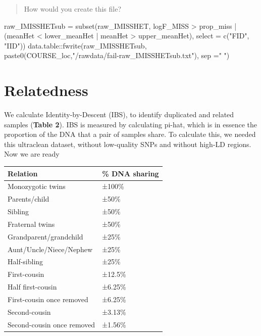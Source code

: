\documentclass[
]{book}
\newenvironment{Shaded}{\begin{snugshade}}{\end{snugshade}}
\newcommand{\AttributeTok}[1]{\textcolor[rgb]{0.77,0.63,0.00}{#1}}
\newcommand{\FunctionTok}[1]{\textcolor[rgb]{0.00,0.00,0.00}{#1}}
\newcommand{\NormalTok}[1]{#1}
\newcommand{\OtherTok}[1]{\textcolor[rgb]{0.56,0.35,0.01}{#1}}
\newcommand{\SpecialCharTok}[1]{\textcolor[rgb]{0.00,0.00,0.00}{#1}}
\newcommand{\StringTok}[1]{\textcolor[rgb]{0.31,0.60,0.02}{#1}}
\begin{document}
\begin{quote}
How would you create this file?
\end{quote}

\begin{Shaded}
\begin{Highlighting}[]
\NormalTok{raw\_IMISSHETsub }\OtherTok{=} \FunctionTok{subset}\NormalTok{(raw\_IMISSHET, logF\_MISS }\SpecialCharTok{\textgreater{}}\NormalTok{ prop\_miss }\SpecialCharTok{|}\NormalTok{ (meanHet }\SpecialCharTok{\textless{}}\NormalTok{ lower\_meanHet }\SpecialCharTok{|}\NormalTok{ meanHet }\SpecialCharTok{\textgreater{}}\NormalTok{ upper\_meanHet),}
                         \AttributeTok{select =} \FunctionTok{c}\NormalTok{(}\StringTok{"FID"}\NormalTok{, }\StringTok{"IID"}\NormalTok{))}
\NormalTok{data.table}\SpecialCharTok{::}\FunctionTok{fwrite}\NormalTok{(raw\_IMISSHETsub, }\FunctionTok{paste0}\NormalTok{(COURSE\_loc,}\StringTok{"/rawdata/fail{-}raw\_IMISSHETsub.txt"}\NormalTok{), }\AttributeTok{sep =}\StringTok{" "}\NormalTok{)}
\end{Highlighting}
\end{Shaded}

\hypertarget{relatedness}{%
\section{Relatedness}\label{relatedness}}

We calculate Identity-by-Descent (IBS), to identify duplicated and related samples (\textbf{Table 2}). IBS is measured by calculating pi-hat, which is in essence the proportion of the DNA that a pair of samples share. To calculate this, we needed this ultraclean dataset, without low-quality SNPs and without high-LD regions. Now we are ready

\begin{longtable}[]{@{}ll@{}}
\toprule
\textbf{Relation} & \textbf{\% DNA sharing} \\
\midrule
\endhead
Monozygotic twins & ±100\% \\
Parents/child & ±50\% \\
Sibling & ±50\% \\
Fraternal twins & ±50\% \\
Grandparent/grandchild & ±25\% \\
Aunt/Uncle/Niece/Nephew & ±25\% \\
Half-sibling & ±25\% \\
First-cousin & ±12.5\% \\
Half first-cousin & ±6.25\% \\
First-cousin once removed & ±6.25\% \\
Second-cousin & ±3.13\% \\
Second-cousin once removed & ±1.56\% \\
\bottomrule
\end{longtable}
\end{document}
